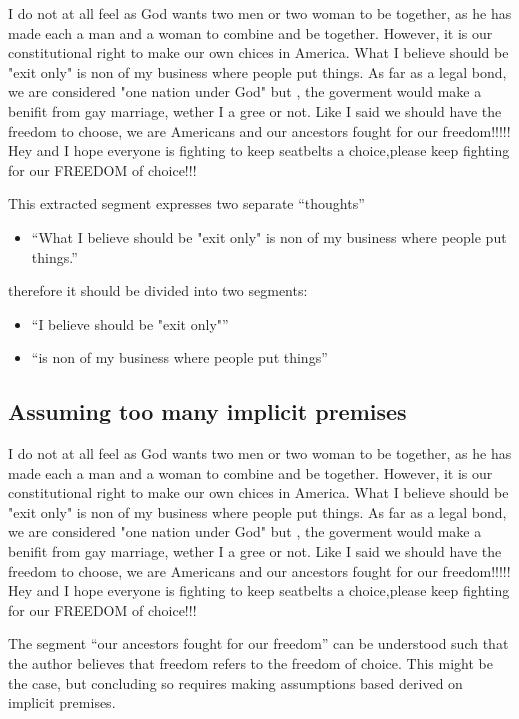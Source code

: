 \begin{mydef}
I do not at all feel as God wants two men or two woman to be together, as he
has made each a man and a woman to combine and be together. However, it is our
constitutional right to make our own chices in America. What I believe should
be "exit only" is non of my business where people put things. As far as a legal
bond, we are considered "one nation under God" but , the goverment would make a
benifit from gay marriage, wether I a gree or not. Like I said we should have
the freedom to choose, we are Americans and our ancestors fought for our
freedom!!!!! Hey and I hope everyone is fighting to keep seatbelts a
choice,please keep fighting for our FREEDOM of choice!!!
\end{mydef}
This extracted segment expresses two separate ``thoughts''
\begin{itemize}
\item[] ``What I believe should be "exit only" is non of my business where people put
things.''
\end{itemize}
therefore it should be divided into two segments:
\begin{itemize}
\item[]  ``I believe should be "exit only"''
\item[] ``is non of my business where people put things''
\end{itemize}

\subsection*{Assuming too many implicit premises}

\begin{mydef}
I do not at all feel as God wants two men or two woman to be together, as he
has made each a man and a woman to combine and be together. However, it is our
constitutional right to make our own chices in America. What I believe should
be "exit only" is non of my business where people put things. As far as a legal
bond, we are considered "one nation under God" but , the goverment would make a
benifit from gay marriage, wether I a gree or not. Like I said we should have
the freedom to choose, we are Americans and our ancestors fought for our
freedom!!!!! Hey and I hope everyone is fighting to keep seatbelts a
choice,please keep fighting for our FREEDOM of choice!!!
\end{mydef}
The segment ``our ancestors fought for our freedom'' can be understood
such that the author believes that freedom refers to the freedom of choice.
This might be the case, but concluding so requires making assumptions based 
derived on implicit premises. 

